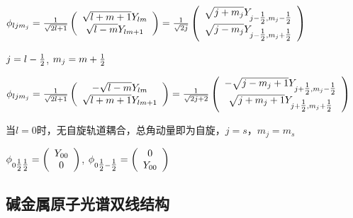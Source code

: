 $\phi _{ljm_j }  = \frac{1}{{\sqrt {2l + 1} }}\left( {\begin{array}{*{20}c}
   {\sqrt {l + m + 1} Y_{lm} }  \\
   {\sqrt {l - m} Y_{lm + 1} }  \\
\end{array}} \right) = \frac{1}{{\sqrt {2j} }}\left( {\begin{array}{*{20}c}
   {\sqrt {j + m_j } Y_{j - {\textstyle{1 \over 2}},m_j  - {\textstyle{1 \over 2}}} }  \\
   {\sqrt {j - m_j } Y_{j - {\textstyle{1 \over 2}},m_j  + {\textstyle{1 \over 2}}} }  \\
\end{array}} \right)$


$j = l - {\textstyle{1 \over 2}}$, $m_j  = m + {\textstyle{1 \over 2}}$

$\phi _{ljm_j }  = \frac{1}{{\sqrt {2l + 1} }}\left( {\begin{array}{*{20}c}
   { - \sqrt {l - m} Y_{lm} }  \\
   {\sqrt {l + m + 1} Y_{lm + 1} }  \\
\end{array}} \right) = \frac{1}{{\sqrt {2j + 2} }}\left( {\begin{array}{*{20}c}
   { - \sqrt {j - m_j  + 1} Y_{j + {\textstyle{1 \over 2}},m_j  - {\textstyle{1 \over 2}}} }  \\
   {\sqrt {j + m_j  + 1} Y_{j + {\textstyle{1 \over 2}},m_j  + {\textstyle{1 \over 2}}} }  \\
\end{array}} \right)$


当$l = 0$时，无自旋轨道耦合，总角动量即为自旋，$j = s$，$m_j = m_s$


$\phi _{0{\textstyle{1 \over 2}}{\textstyle{1 \over 2}}}  = \left( {\begin{array}{*{20}c}
   {Y_{00} }  \\
   0  \\
\end{array}} \right)$, $\phi _{0{\textstyle{1 \over 2}} - {\textstyle{1 \over 2}}}  = \left( {\begin{array}{*{20}c}
   0  \\
   {Y_{00} }  \\
\end{array}} \right)$


\subsection{碱金属原子光谱双线结构}


